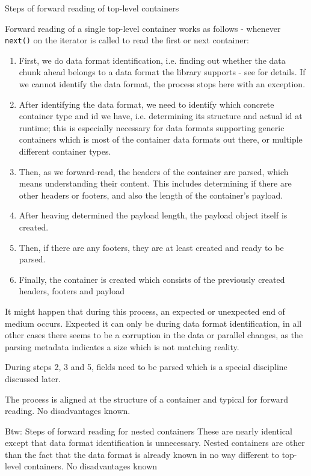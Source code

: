 {%
Steps of forward reading of top-level containers
}
{%
  Forward reading of a single top-level container works as follows - whenever \texttt{next()} on the iterator is called to read the first or next container:
  \begin{enumerate}
  \item First, we do data format identification, i.e. finding out whether the data chunk ahead belongs to a data format the library supports - see  for details. If we cannot identify the data format, the process stops here with an exception.
  \item After identifying the data format, we need to identify which concrete container type and id we have, i.e. determining its structure and actual id at runtime; this is especially necessary for data formats supporting generic containers which is most of the container data formats out there, or multiple different container types. 
  \item Then, as we forward-read, the headers of the container are parsed, which means understanding their content. This includes determining if there are other headers or footers, and also the length of the container's payload.
  \item After heaving determined the payload length, the payload object itself is created. 
  \item Then, if there are any footers, they are at least created and ready to be parsed.
  \item Finally, the container is created which consists of the previously created headers, footers and payload
  \end{enumerate}
  It might happen that during this process, an expected or unexpected end of medium occurs. Expected it can only be during data format identification, in all other cases there seems to be a corruption in the data or parallel changes, as the parsing metadata indicates a size which is not matching reality.

  During steps 2, 3 and 5, fields need to be parsed which is a special discipline discussed later.
}
{%
The process is aligned at the structure of a container and typical for forward reading.
}
{%
No disadvantages known.
}

Btw:
{%
Steps of forward reading for nested containers
}
{%
These are nearly identical except that data format identification is unnecessary.
}
{%
Nested containers are other than the fact that the data format is already known in no way different to top-level containers.
}
{%
No disadvantages known
}


